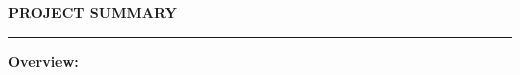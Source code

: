 \documentclass[11pt]{article}
\begin{document}
\thispagestyle{empty}
\setcounter{secnumdepth}{4}
\renewcommand{\thesubsection}{\Alph{subsection}}
\renewcommand{\thesubsubsection}{\arabic{subsubsection}}
                                                                                
\begin{center}
\begin{large}
{\bf PROJECT SUMMARY} \\
\end{large}
\end{center}
\hrule

\vspace*{0.1in}

\hspace*{-0.28in} {\bf Overview:} \\ 

\end{document}
